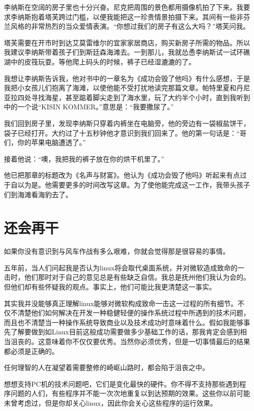 李纳斯在空阔的房子里也十分兴奋。尼克把周围的景色都用摄像机拍了下来。我要求李纳斯抱着塔芙跨过门槛，以便我能把这一珍贵情景拍摄下来。其间有一些非芬兰风格的非常热烈的当众爱情表演。“你想过我们的房子有这么大吗？”塔芙问我。

塔芙需要在开市时到达艾莫雷维尔的宜家家居商店，购买新房子所需的物品。所以我建议李纳斯带着孩子们到斯廷森海滩去。一到那儿，我就怂恿李纳斯试一试环礁湖中的皮筏玩耍。等他爬上码头的时候，裤子已经湿漉漉的了。

我想让李纳斯告诉我，他对书中的一章名为《成功会毁了他吗》有什么感想，于是我把小女孩儿们抱离了海滩，以使他能不受打扰地读完那篇文章。帕特里夏和丹尼亚拉四处寻找海星，甚至踮着脚尖走到了海水里，玩了大约半个小时，直到我听到中的一个说“KISIN KOMMER。”意思是：“我要撒尿了。”

我们回到房子里，发现李纳斯只穿着内裤坐在电脑旁，他的旁边有一袋椒盐饼干，袋子已经打开。大约过了十五秒钟他才意识到我们回来了。他的第一句话是：“哥们，你的苹果电脑遭透了。”

接着他说：“噢，我把我的裤子放在你的烘干机里了。”

他已把那章的标题改为《名声与财富》。他认为《成功会毁了他吗》听起来有点过于自以为是。他需要更多的时间改写这章。为了使他能完成这一工作，我带头孩子们到海滩看海豹去了。

 
\section{还会再干}

如果你没有意识到与风车作战有多么艰难，你就会觉得那是很容易的事情。

五年前，当人们问起我是否认为linux将会取代桌面系统，并对微软造成致命的一击时，他们那时对于自己的意见总是有些缺乏自信。我总是抚州他们我认为会的。但他们却有些怀疑我的观点。事实上，他们可能比我更清楚这一事实。

其实我并没能够真正理解linux能够对微软构成致命一击这一过程的所有细节。不仅不清楚他们如何解决在开发一种稳健轻便的操作系统过程中所遇到的技术问题，而且也不清楚当一种操作系统导致商业以及技术成功时意味着什么。假如我能够事先了解要做到如Linux目前这般成功需要做多少基础工作的话，那我肯定会感到相当沮丧的。这意味着你不仅仅要优秀。当然你必须优秀，但是一切事情最后的结果都必须是正确的。

任何理智的人在凝望着需要整修的崎岖山路时，都会陷于沮丧之中。

想想支持PC机的技术问题吧，它们是变化最快的硬件。你不得不支持那些遇到程序问题的人们，有些程序并不能一次次地重复以到达预期的效果。这些你以前可能未曾考虑过，但是你却关心linux，因此你会关心这些程序的运行效果。

